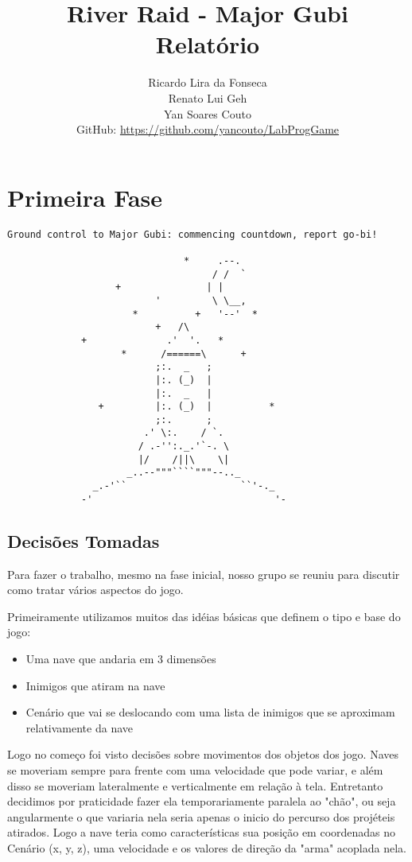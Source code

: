 \documentclass[12pt,a4paper]{article}
\title{\vspace{-130pt}
River Raid - Major Gubi \\
		Relatório}
\author{Ricardo Lira da Fonseca\\Renato Lui Geh\\Yan Soares Couto\\GitHub: \url{https://github.com/yancouto/LabProgGame}}
\date{}
\begin{document}
	\maketitle
	\section{Primeira Fase}
	\begin{verbatim}
Ground control to Major Gubi: commencing countdown, report go-bi!

                               *     .--.
                                    / /  `
                   +               | |
                          '         \ \__,
                      *          +   '--'  *
                          +   /\
             +              .'  '.   *
                    *      /======\      +
                          ;:.  _   ;
                          |:. (_)  |
                          |:.  _   |
                +         |:. (_)  |          *
                          ;:.      ;
                        .' \:.    / `.
                       / .-'':._.'`-. \
                       |/    /||\    \|
                     _..--"""````"""--.._
               _.-'``                    ``'-._
             -'                                '-
	\end{verbatim}
		\subsection{Decisões Tomadas}
		Para fazer o trabalho, mesmo na fase inicial, nosso grupo se reuniu para discutir como tratar vários 					aspectos do jogo.
	
	  	Primeiramente utilizamos muitos das idéias básicas que definem o tipo e base do jogo:
	  	\begin{itemize}
	  		\item Uma nave que andaria em 3 dimensões
	  		\item Inimigos que atiram na nave
	  		\item Cenário que vai se deslocando com uma lista de inimigos que se aproximam relativamente da nave
	  	\end{itemize}
	  	Logo no começo foi visto decisões sobre movimentos dos objetos dos jogo. Naves se moveriam
		sempre para frente com uma velocidade que pode variar, e além disso se moveriam lateralmente
		e verticalmente em relação à tela. Entretanto decidimos por praticidade fazer ela temporariamente
		paralela ao "chão", ou seja angularmente o que variaria nela seria apenas o inicio do percurso
		dos projéteis atirados. Logo a nave teria como características sua posição em coordenadas no
		Cenário (x, y, z), uma velocidade e os valores de direção da "arma" acoplada nela.\\
		
\end{document}
